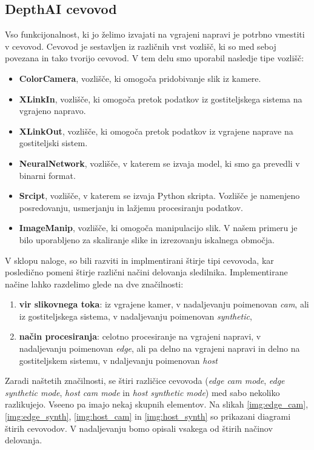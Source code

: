 \documentclass[a4paper,12pt,openright]{book}
\begin{document}
\subsection{DepthAI cevovod}
\label{sec:pipeline}
Vso funkcijonalnost, ki jo želimo izvajati na vgrajeni napravi je potrbno vmestiti v cevovod. Cevovod je sestavljen iz različnih vrst vozlišč, ki so med seboj povezana in tako tvorijo cevovod. V tem delu smo uporabil nasledje tipe vozlišč:

\begin{itemize}
    \item \textbf{ColorCamera}, vozlišče, ki omogoča pridobivanje slik iz kamere.
    \item \textbf{XLinkIn}, vozlišče, ki omogoča pretok podatkov iz gostiteljskega sistema na vgrajeno napravo.
    \item \textbf{XLinkOut}, vozlišče, ki omogoča pretok podatkov iz vgrajene naprave na gostiteljski sistem.
    \item \textbf{NeuralNetwork}, vozlišče, v katerem se izvaja model, ki smo ga prevedli v binarni format.
    \item \textbf{Srcipt}, vozlišče, v katerem se izvaja Python skripta. Vozlišče je namenjeno posredovanju, usmerjanju in lažjemu procesiranju podatkov.
    \item \textbf{ImageManip}, vozlišče, ki omogoča manipulacijo slik. V našem primeru je bilo uporabljeno za skaliranje slike in izrezovanju iskalnega območja.
\end{itemize}


V sklopu naloge, so bili razviti in implmentirani štirje tipi cevovoda, kar posledično pomeni štirje različni načini delovanja sledilnika. Implementirane načine lahko razdelimo glede na dve značilnosti:

\begin{enumerate}
    \item \textbf{vir slikovnega toka}: iz vgrajene kamer, v nadaljevanju poimenovan \emph{cam}, ali iz gostiteljskega sistema, v nadaljevanju poimenovan \emph{synthetic},
    \item \textbf{način procesiranja}: celotno procesiranje na vgrajeni napravi, v nadaljevanju poimenovan \emph{edge}, ali pa delno na vgrajeni napravi in delno na gostiteljskem sistemu, v ndaljevanju poimenovan \emph{host}
\end{enumerate}

Zaradi naštetih značilnosti, se štiri različice cevovoda (\emph{edge cam mode}, \emph{edge synthetic mode}, \emph{host cam mode} in \emph{host synthetic mode}) med sabo nekoliko razlikujejo. Vseeno pa imajo nekaj skupnih elementov. Na slikah \ref{img:edge_cam}, \ref{img:edge_synth}, \ref{img:host_cam} in \ref{img:host_synth} so prikazani diagrami štirih cevovodov. V nadaljevanju bomo opisali vsakega od štirih načinov delovanja.
\end{document}

